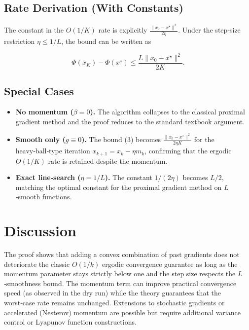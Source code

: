 \documentclass{article}
\begin{document}
\subsection*{Rate Derivation (With Constants)}
The constant in the $O(1/K)$ rate is explicitly $\frac{\|x_{0}-x^{\star}\|^{2}}{2\eta}$. Under the step‑size restriction $\eta\le 1/L$, the bound can be written as  

\[
\Phi(\bar{x}_{K})-\Phi(x^{\star})\le \frac{L\|x_{0}-x^{\star}\|^{2}}{2K}.
\]

\subsection*{Special Cases}
\begin{itemize}
  \item \textbf{No momentum ($\beta=0$).} The algorithm collapses to the classical proximal gradient method and the proof reduces to the standard textbook argument.
  \item \textbf{Smooth only ($g\equiv0$).} The bound (3) becomes $\frac{\|x_{0}-x^{\star}\|^{2}}{2\eta K}$ for the heavy‑ball‑type iteration $x_{k+1}=x_{k}-\eta m_{k}$, confirming that the ergodic $O(1/K)$ rate is retained despite the momentum.
  \item \textbf{Exact line‑search ($\eta=1/L$).} The constant $1/(2\eta)$ becomes $L/2$, matching the optimal constant for the proximal gradient method on $L$‑smooth functions.
\end{itemize}

\section*{Discussion}
The proof shows that adding a convex combination of past gradients does not deteriorate the classic $O(1/k)$ ergodic convergence guarantee as long as the momentum parameter stays strictly below one and the step size respects the $L$‑smoothness bound. The momentum term can improve practical convergence speed (as observed in the dry run) while the theory guarantees that the worst‑case rate remains unchanged. Extensions to stochastic gradients or accelerated (Nesterov) momentum are possible but require additional variance control or Lyapunov function constructions.
\end{document}
